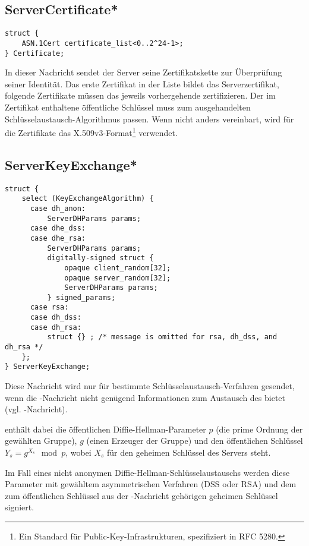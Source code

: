 \subsection{ServerCertificate*}

\begin{lstlisting}
struct {
	ASN.1Cert certificate_list<0..2^24-1>;
} Certificate;
\end{lstlisting}

In dieser Nachricht sendet der Server seine Zertifikatskette zur Überprüfung seiner Identität. Das erste Zertifikat in der Liste bildet das Serverzertifikat, folgende Zertifikate müssen das jeweils vorhergehende zertifizieren. Der im Zertifikat enthaltene öffentliche Schlüssel muss zum ausgehandelten Schlüsselaustausch-Algorithmus passen. Wenn nicht anders vereinbart, wird für die Zertifikate das X.509v3-Format\footnote{Ein Standard für Public-Key-Infrastrukturen, spezifiziert in RFC 5280.} verwendet.

\subsection{ServerKeyExchange*}

\begin{lstlisting}
struct {
	select (KeyExchangeAlgorithm) {
	  case dh_anon:
	      ServerDHParams params;
	  case dhe_dss:
	  case dhe_rsa:
	      ServerDHParams params;
	      digitally-signed struct {
	          opaque client_random[32];
	          opaque server_random[32];
	          ServerDHParams params;
	      } signed_params;
	  case rsa:
	  case dh_dss:
	  case dh_rsa:
	      struct {} ; /* message is omitted for rsa, dh_dss, and dh_rsa */
	};
} ServerKeyExchange;
\end{lstlisting}

Diese Nachricht wird nur für bestimmte Schlüsselaustausch-Verfahren gesendet, wenn die \servercertificate{}-Nachricht nicht genügend Informationen zum Austausch des \premastersecret{} bietet (vgl. \clientkeyexchange{}-Nachricht).

 enthält dabei die öffentlichen Diffie-Hellman-Parameter \(p\) (die prime Ordnung der gewählten Gruppe), \(g\) (einen Erzeuger der Gruppe) und den öffentlichen Schlüssel \(Y_s = g^{X_s} \mod{p}\), wobei \(X_s\) für den geheimen Schlüssel des Servers steht.

Im Fall eines nicht anonymen Diffie-Hellman-Schlüsselaustauschs werden diese Parameter mit gewähltem asymmetrischen Verfahren (DSS oder RSA) und dem zum öffentlichen Schlüssel aus der \servercertificate{}-Nachricht gehörigen geheimen Schlüssel signiert.

